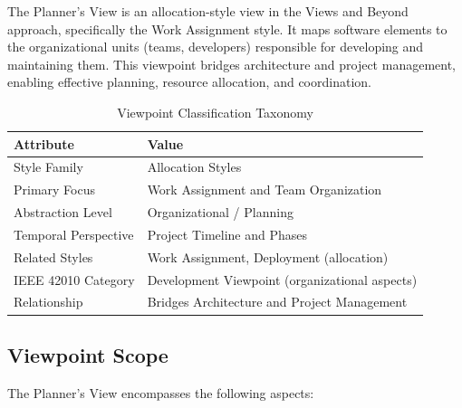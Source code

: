 \documentclass[11pt,letterpaper]{article}
\begin{document}
The Planner's View is an allocation-style view in the Views and Beyond approach, specifically the Work Assignment style. It maps software elements to the organizational units (teams, developers) responsible for developing and maintaining them. This viewpoint bridges architecture and project management, enabling effective planning, resource allocation, and coordination.

\begin{table}[H]
\centering
\caption{Viewpoint Classification Taxonomy}
\begin{tabular}{@{}L{4cm}L{10cm}@{}}
\toprule
\textbf{Attribute} & \textbf{Value} \\
\midrule
Style Family & Allocation Styles \\
Primary Focus & Work Assignment and Team Organization \\
Abstraction Level & Organizational / Planning \\
Temporal Perspective & Project Timeline and Phases \\
Related Styles & Work Assignment, Deployment (allocation) \\
IEEE 42010 Category & Development Viewpoint (organizational aspects) \\
Relationship & Bridges Architecture and Project Management \\
\bottomrule
\end{tabular}
\end{table}

\subsection{Viewpoint Scope}

The Planner's View encompasses the following aspects:
\end{document}
